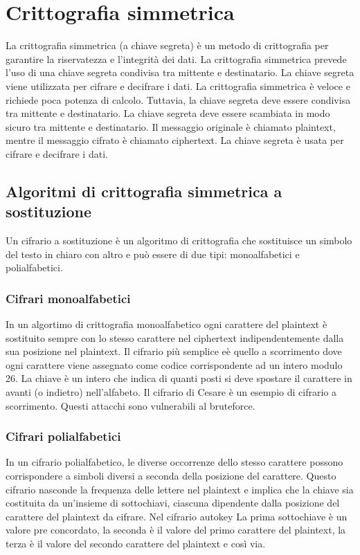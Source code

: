 \documentclass[12pt]{report}
\begin{document}
\section{Crittografia simmetrica}
La crittografia simmetrica (a chiave segreta) è un metodo di crittografia per garantire la riservatezza e l'integrità dei dati. La crittografia simmetrica prevede l'uso di una chiave segreta condivisa tra mittente e destinatario. La chiave segreta viene utilizzata per cifrare e decifrare i dati. La crittografia simmetrica è veloce e richiede poca potenza di calcolo. Tuttavia, la chiave segreta deve essere condivisa tra mittente e destinatario. La chiave segreta deve essere scambiata in modo sicuro tra mittente e destinatario. Il messaggio originale è chiamato plaintext, mentre il messaggio cifrato è chiamato ciphertext. La chiave segreta è usata per cifrare e decifrare i dati.

\subsection{Algoritmi di crittografia simmetrica a sostituzione}
Un cifrario a sostituzione è un algoritmo di crittografia che sostituisce un simbolo del testo in chiaro con altro e può essere di due tipi: monoalfabetici e polialfabetici.

\subsubsection{Cifrari monoalfabetici}
In un algortimo di crittografia monoalfabetico ogni carattere del plaintext è sostituito sempre con lo stesso carattere nel ciphertext indipendentemente dalla sua posizione nel plaintext. Il cifrario più semplice eè quello a scorrimento dove ogni carattere viene assegnato come codice corrispondente ad un intero modulo 26. La chiave è un intero che indica di quanti posti si deve spostare il carattere in avanti (o indietro) nell'alfabeto. Il cifrario di Cesare è un esempio di cifrario a scorrimento. Questi attacchi sono vulnerabili al bruteforce.

\subsubsection{Cifrari polialfabetici}
In un cifrario polialfabetico, le diverse occorrenze dello stesso carattere possono corrispondere a simboli diversi a seconda della posizione del carattere. Questo cifrario nasconde la frequenza delle lettere nel plaintext e implica che la chiave sia costituita da un'insieme di sottochiavi, ciascuna dipendente dalla posizione del carattere del plaintext da cifrare. Nel cifrario autokey La prima sottochiave è un valore pre concordato, la seconda è il valore del primo carattere del plaintext, la terza è il valore del secondo carattere del plaintext e così via. 
\end{document}
